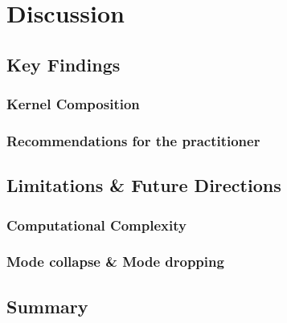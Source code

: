 \chapter{Discussion}

\section{Key Findings}

\subsection{Kernel Composition}

\subsection{Recommendations for the practitioner}

\section{Limitations \& Future Directions}

\subsection{Computational Complexity}

\subsection{Mode collapse \& Mode dropping}

\section{Summary}
